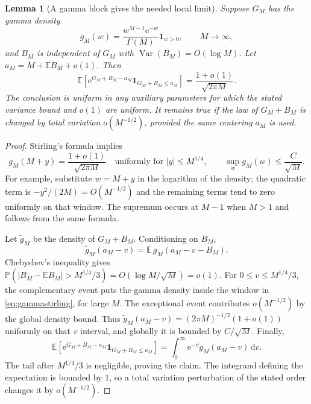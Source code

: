 \documentclass[11pt,a4paper]{article}
\newtheorem{lemma}[theorem]{Lemma}
\theoremstyle{definition}
\theoremstyle{remark}\newtheorem{remark}[theorem]{Remark}
\newcommand{\PP}{\mathbb P}
\newcommand{\EE}{\mathbb E}
\newcommand{\Var}{\operatorname{Var}}
\newcommand{\dd}{\,\mathrm d}
\newcommand{\e}{\mathrm e}
\newcommand{\ind}{\mathbf 1}
\begin{document}
\begin{lemma}[A gamma block gives the needed local limit]
\label{lem:gamma}
Suppose $G_M$ has the gamma density
\[
 g_M(w)=\frac{w^{M-1}\e^{-w}}{\Gamma(M)}\ind_{w>0},
 \qquad M\to\infty,
\]
and $B_M$ is independent of $G_M$ with
$\Var(B_M)=O(\log M)$.  Let
$a_M=M+\EE B_M+o(1)$.  Then
\begin{equation}
 \EE\left[\e^{G_M+B_M-a_M}
                \ind_{G_M+B_M\le a_M}\right]
 =\frac{1+o(1)}{\sqrt{2\pi M}}.
 \label{eq:gammalocal}
\end{equation}
The conclusion is uniform in any auxiliary parameters for which the stated
variance bound and $o(1)$ are uniform.  It remains true if the law of
$G_M+B_M$ is changed by total variation $o(M^{-1/2})$, provided the same
centering $a_M$ is used.
\end{lemma}
\begin{proof}
Stirling's formula implies
\begin{equation}
 g_M(M+y)=\frac{1+o(1)}{\sqrt{2\pi M}}
       \quad\text{uniformly for }|y|\le M^{1/4},
 \qquad \sup_w g_M(w)\le\frac{C}{\sqrt M}.
 \label{eq:gammastirling}
\end{equation}
For example, substitute $w=M+y$ in the logarithm of the density; the quadratic
term is $-y^2/(2M)=O(M^{-1/2})$ and the remaining terms tend to zero uniformly
on that window.  The supremum occurs at $M-1$ when $M>1$ and follows from
the same formula.

Let $\widetilde g_M$ be the density of $G_M+B_M$.  Conditioning on $B_M$,
\[
 \widetilde g_M(a_M-v)=\EE\,g_M(a_M-v-B_M).
\]
Chebyshev's inequality gives
$\PP(|B_M-\EE B_M|>M^{1/4}/3)=O(\log M/\sqrt M)=o(1)$.
For $0\le v\le M^{1/4}/3$, the complementary event puts the gamma density
inside the window in \eqref{eq:gammastirling}, for large $M$.
The exceptional event contributes $o(M^{-1/2})$ by the global density bound.
Thus $\widetilde g_M(a_M-v)=(2\pi M)^{-1/2}(1+o(1))$ uniformly on that
$v$ interval, and globally it is bounded by $C/\sqrt M$.
Finally,
\[
 \EE[\e^{G_M+B_M-a_M}\ind_{G_M+B_M\le a_M}]
 =\int_0^\infty\e^{-v}\widetilde g_M(a_M-v)\dd v.
\]
The tail after $M^{1/4}/3$ is negligible, proving the claim.
The integrand defining the expectation is bounded by $1$, so a total
variation perturbation of the stated order changes it by $o(M^{-1/2})$.
\end{proof}
\end{document}
